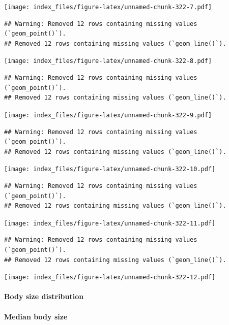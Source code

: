 \documentclass[
]{article}
\begin{document}
\texttt{[image: index\_files/figure-latex/unnamed-chunk-322-7.pdf]}

\begin{verbatim}
## Warning: Removed 12 rows containing missing values (`geom_point()`).
## Removed 12 rows containing missing values (`geom_line()`).
\end{verbatim}

\texttt{[image: index\_files/figure-latex/unnamed-chunk-322-8.pdf]}

\begin{verbatim}
## Warning: Removed 12 rows containing missing values (`geom_point()`).
## Removed 12 rows containing missing values (`geom_line()`).
\end{verbatim}

\texttt{[image: index\_files/figure-latex/unnamed-chunk-322-9.pdf]}

\begin{verbatim}
## Warning: Removed 12 rows containing missing values (`geom_point()`).
## Removed 12 rows containing missing values (`geom_line()`).
\end{verbatim}

\texttt{[image: index\_files/figure-latex/unnamed-chunk-322-10.pdf]}

\begin{verbatim}
## Warning: Removed 12 rows containing missing values (`geom_point()`).
## Removed 12 rows containing missing values (`geom_line()`).
\end{verbatim}

\texttt{[image: index\_files/figure-latex/unnamed-chunk-322-11.pdf]}

\begin{verbatim}
## Warning: Removed 12 rows containing missing values (`geom_point()`).
## Removed 12 rows containing missing values (`geom_line()`).
\end{verbatim}

\texttt{[image: index\_files/figure-latex/unnamed-chunk-322-12.pdf]}

\hypertarget{body-size-distribution-1}{%
\paragraph{Body size distribution}\label{body-size-distribution-1}}

\hypertarget{median-body-size-1}{%
\paragraph{Median body size}\label{median-body-size-1}}
\end{document}

